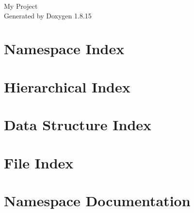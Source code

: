 \let\mypdfximage\pdfximage\def\pdfximage{\immediate\mypdfximage}\documentclass[twoside]{book}
\newcommand{\+}{\discretionary{\mbox{\scriptsize$\hookleftarrow$}}{}{}}
\newcommand{\clearemptydoublepage}{%
  \newpage{\pagestyle{empty}\cleardoublepage}%
}
\begin{document}
\hypersetup{pageanchor=false,
             bookmarksnumbered=true,
             pdfencoding=unicode
            }
\begin{titlepage}
\vspace*{7cm}
\begin{center}%
{\Large My Project }\\
\vspace*{1cm}
{\large Generated by Doxygen 1.8.15}\\
\end{center}
\end{titlepage}
\clearemptydoublepage
{}
\tableofcontents
\clearemptydoublepage
{}
\hypersetup{pageanchor=true}

\chapter{Namespace Index}

\chapter{Hierarchical Index}

\chapter{Data Structure Index}

\chapter{File Index}

\chapter{Namespace Documentation}



\end{document}
